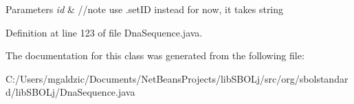 \begin{DoxyParams}{Parameters}
{\em id} & //note use .setID instead for now, it takes string \\
\hline
\end{DoxyParams}


Definition at line 123 of file DnaSequence.java.



The documentation for this class was generated from the following file:\begin{DoxyCompactItemize}
\item 
C:/Users/mgaldzic/Documents/NetBeansProjects/libSBOLj/src/org/sbolstandard/libSBOLj/DnaSequence.java\end{DoxyCompactItemize}
